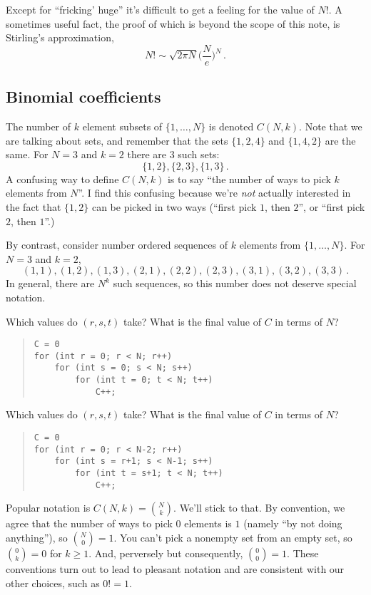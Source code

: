 \documentclass{tufte-handout}
\begin{document}
Except for ``fricking' huge'' it's difficult to get a feeling for the
value of $N!$. A sometimes useful fact, the proof of which is beyond
the scope of this note, is Stirling's approximation,
\[ N! \sim \sqrt{2\pi N} \bigl(\frac{N}{e}\bigr) ^N\,.\]


\subsection{Binomial coefficients}

The number of $k$ element subsets of $\{1,\ldots, N\}$ is denoted
$C(N,k)$. Note that we are talking about sets, and remember that the sets
$\{1,2,4\}$ and $\{1,4,2\}$ are the same. 
For $N=3$ and $k=2$ there are 3 such
sets:
\[ \{1,2\}, \{2,3\}, \{1, 3\}\,.\] A confusing
way to define
$C(N,k)$ is to say ``the number of ways to pick $k$ elements from
$N$''. I find this confusing because we're \emph{not} actually
interested in the fact that $\{1,2\}$ can be picked in two ways
(``first pick $1$, then $2$'', or ``first pick $2$, then $1$''.)

By contrast, consider number ordered sequences of $k$
elements from $\{1,\ldots, N\}$. For $N=3$ and $k=2$,
\[ (1,1), (1,2), (1,3), (2,1), (2,2), (2,3),(3,1), (3,2), (3,3)\,.\]
In general, there are $N^k$ such sequences, so this number does not
deserve special notation.

\begin{ExerciseList}
\Exercise  Which values do $(r,s,t)$ take? What is the final value of
$C$ in terms of $N$?
\begin{quote}
\begin{lstlisting}[basicstyle=\ttfamily\small]
C = 0
for (int r = 0; r < N; r++)
    for (int s = 0; s < N; s++)
        for (int t = 0; t < N; t++)
            C++;
\end{lstlisting}
\end{quote}
\Exercise Which values do $(r,s,t)$ take? What is the final value of
$C$ in terms of $N$?
\begin{quote}
\begin{lstlisting}[basicstyle=\ttfamily\small]
C = 0
for (int r = 0; r < N-2; r++)
    for (int s = r+1; s < N-1; s++)
        for (int t = s+1; t < N; t++)
            C++;
\end{lstlisting}
\end{quote}
\end{ExerciseList}

Popular notation is $C(N,k)=\binom{N}{k}$. We'll stick to that. 
By
convention, we agree that the number of ways to pick $0$ elements is $1$
(namely ``by not doing anything''), so $\binom{N}{0}= 1$.
You can't pick a nonempty set from an empty set, so $\binom{0}{k}=0$ for
$k\geq 1$.
And, perversely but consequently, $\binom{0}{0}=1$.
These
conventions turn out to lead to pleasant notation and are consistent
with our other choices, such as $0!=1$.
\end{document}

